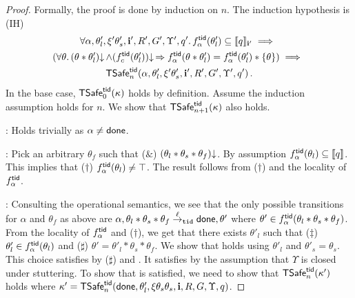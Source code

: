 \begin{proof}
Formally, the proof is done by induction on $n$.
The induction hypothesis is  (IH)  
\begin{multline*}
  \forall \alpha,\theta'_l,\xi'\theta'_s,{\bf i}',R',G',\Upsilon', q'.\,
   f^{{\sf tid}}_{\alpha}(\theta_l') \subseteq \llbracket q \rrbracket_{{\bf i}'} \implies \mbox{}\\
    (\forall \theta.\, (\theta*\theta'_l)\mathpunct{\downarrow} \land (f^{{\sf tid}}_c(\theta_l'))\mathpunct{\downarrow} \Rightarrow
     f^{{\sf tid}}_\alpha(\theta *\theta'_l) = f^{{\sf tid}}_\alpha(\theta'_l)*\{\theta\})
  \implies \mbox{}\\
  {\sf TSafe}^{{\sf tid}}_n(\alpha,\theta'_l,\xi'\theta'_s,{\bf i}',R',G',\Upsilon', q')\,.
\end{multline*}
In the base case, 
${\sf TSafe}^{{\sf tid}}_0(\kappa)$ holds by definition.
Assume the induction assumption holds for $n$. 
We show that ${\sf TSafe}^{{\sf tid}}_{n+1}(\kappa)$ also holds.

: 
Holds trivially as $\alpha \neq {\sf done}$.

:
Pick an arbitrary $\theta_f$ such that ($\&$)  $(\theta_l*\theta_s*\theta_f)\mathpunct{\downarrow}$.
By assumption  $f^{{\sf tid}}_\alpha(\theta_l) \subseteq \llbracket q \rrbracket$. This  implies that ($\dagger$) 
$f^{{\sf tid}}_\alpha(\theta_l) \neq \top$. The result follows from ($\dagger$) and   
the locality of $f^{{\sf tid}}_\alpha$.

: 
Consulting the operational semantics, we see that the only possible transitions
for $\alpha$ and $\theta_f$ as above are
$\alpha, \theta_l*\theta_s*\theta_f \stackrel{\ell}{\rightarrow}_{\texttt{tid}} {\sf done},\theta'$ 
where $\theta' \in f^{{\sf tid}}_\alpha(\theta_l*\theta_s*\theta_f)$.
From the locality of $f^{{\sf tid}}_\alpha$ and ($\dag$), 
we get that there exists $\theta'_l$ such that 
($\ddag$) $\theta'_l \in f^{{\sf tid}}_\alpha(\theta_l)$ and
($\sharp$)  $\theta'=\theta'_l * \theta_s * \theta_f$. 
We show that  holds using
$\theta'_l$ 
and  $\theta'_s = \theta_s$.
This choice satisfies  by ($\sharp$) and .
It satisfies   by the assumption that $\Upsilon$ is closed under stuttering. 
To show that  is satisfied,  
we need to show that ${\sf TSafe}^{{\sf tid}}_{n}(\kappa')$ holds
where $\kappa'={\sf TSafe}^{{\sf tid}}_n({\sf done},\theta'_l,\xi\theta_s\theta_s,{\bf i},R,G,\Upsilon, q)$. 


\end{proof}
